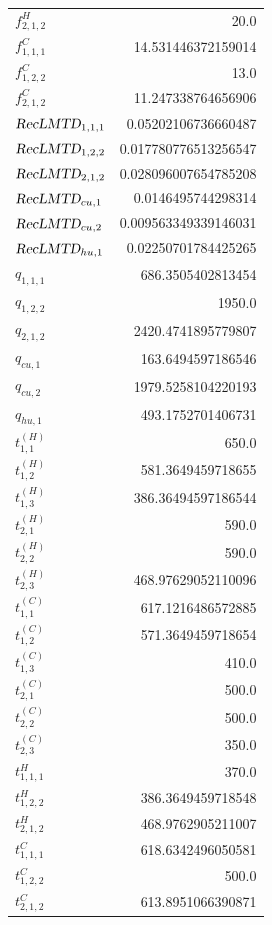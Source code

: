 \documentclass{article}%
\begin{document}
\begin{multicols*}{3}
\begin{supertabular}{lr}
	$f_{2,1,2}^{H}$ & 20.0 \\%
	$f_{1,1,1}^{C}$ & 14.531446372159014 \\%
	$f_{1,2,2}^{C}$ & 13.0 \\%
	$f_{2,1,2}^{C}$ & 11.247338764656906 \\%
	$\textsl{RecLMTD}_{1,1,1}$ & 0.05202106736660487 \\%
	$\textsl{RecLMTD}_{1,2,2}$ & 0.017780776513256547 \\%
	$\textsl{RecLMTD}_{2,1,2}$ & 0.028096007654785208 \\%
	$\textsl{RecLMTD}_{cu,1}$ & 0.0146495744298314 \\%
	$\textsl{RecLMTD}_{cu,2}$ & 0.009563349339146031 \\%
	$\textsl{RecLMTD}_{hu,1}$ & 0.02250701784425265 \\%
	$q_{1,1,1}$ & 686.3505402813454 \\%
	$q_{1,2,2}$ & 1950.0 \\%
	$q_{2,1,2}$ & 2420.4741895779807 \\%
	$q_{cu,1}$ & 163.6494597186546 \\%
	$q_{cu,2}$ & 1979.5258104220193 \\%
	$q_{hu,1}$ & 493.1752701406731 \\%
	$t_{1,1}^{(H)}$ & 650.0 \\%
	$t_{1,2}^{(H)}$ & 581.3649459718655 \\%
	$t_{1,3}^{(H)}$ & 386.36494597186544 \\%
	$t_{2,1}^{(H)}$ & 590.0 \\%
	$t_{2,2}^{(H)}$ & 590.0 \\%
	$t_{2,3}^{(H)}$ & 468.97629052110096 \\%
	$t_{1,1}^{(C)}$ & 617.1216486572885 \\%
	$t_{1,2}^{(C)}$ & 571.3649459718654 \\%
	$t_{1,3}^{(C)}$ & 410.0 \\%
	$t_{2,1}^{(C)}$ & 500.0 \\%
	$t_{2,2}^{(C)}$ & 500.0 \\%
	$t_{2,3}^{(C)}$ & 350.0 \\%
	$t_{1,1,1}^{H}$ & 370.0 \\%
	$t_{1,2,2}^{H}$ & 386.3649459718548 \\%
	$t_{2,1,2}^{H}$ & 468.9762905211007 \\%
	$t_{1,1,1}^{C}$ & 618.6342496050581 \\%
	$t_{1,2,2}^{C}$ & 500.0 \\%
	$t_{2,1,2}^{C}$ & 613.8951066390871 \\%

\end{supertabular}
\end{multicols*}
\end{document}

